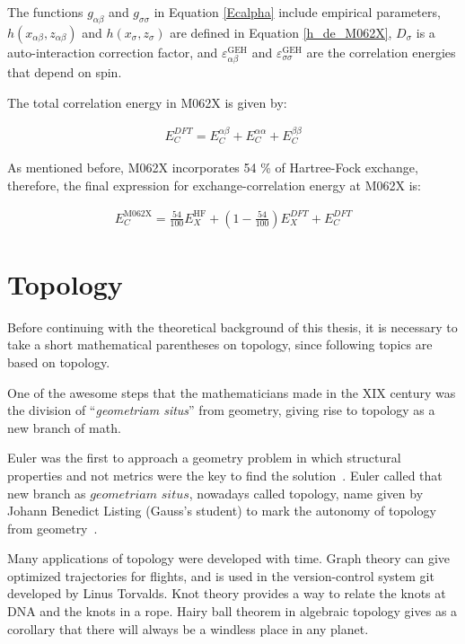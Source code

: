 \pagebreak

The functions $g_{\alpha\beta}$ and $g_{\sigma\sigma}$ in Equation
\ref{Ecalpha} include empirical parameters, $h(x_{\alpha\beta},z_{\alpha\beta})$
and $h(x_{\sigma},z_{\sigma})$ are defined in Equation \ref{h_de_M062X},
$D_\sigma$ is a auto-interaction correction factor, and
$\varepsilon^{\mathrm{GEH}}_{\alpha\beta}$ and
$\varepsilon^{\mathrm{GEH}}_{\sigma\sigma}$ are the correlation energies that
depend on spin.

The total correlation energy in M062X is given by:

\begin{align}
E^{DFT}_C = E^{\alpha\beta}_C + E_C^{\alpha\alpha} + E_C^{\beta\beta}
\end{align}

As mentioned before, M062X incorporates 54 \% of Hartree-Fock exchange, therefore,
the final expression for exchange-correlation energy at M062X is:

\begin{align}
E_C^{\mathrm{M062X}} = \frac{54}{100}E_X^{\mathrm{HF}} +
\left( 1- \frac{54}{100} \right)E_X^{DFT} + E_C^{DFT}
\end{align}

\section{Topology}

Before continuing with the theoretical background of this thesis, it is
necessary to take a short mathematical parentheses on topology, since following
topics are based on topology.

One of the awesome steps that the mathematicians made in the XIX century was the
division of ``\textit{geometriam situs}'' from geometry, giving rise to topology as
a new branch of math.

Euler was the first to approach a geometry problem in which structural
properties and not metrics were the key to find the solution~\cite{euler1736}.
Euler called that new branch as $geometriam$ $situs$, nowadays called topology,
name given by Johann Benedict Listing (Gauss's student) to mark the autonomy
of topology from geometry~\cite{listing}.

Many applications of topology were developed with time. Graph theory can give
optimized trajectories for flights, and is used in the version-control system
git developed by Linus Torvalds. Knot theory provides a way to relate the knots at
DNA and the knots in a rope. Hairy ball theorem in algebraic topology gives as
a corollary that there will always be a windless place in any planet.

